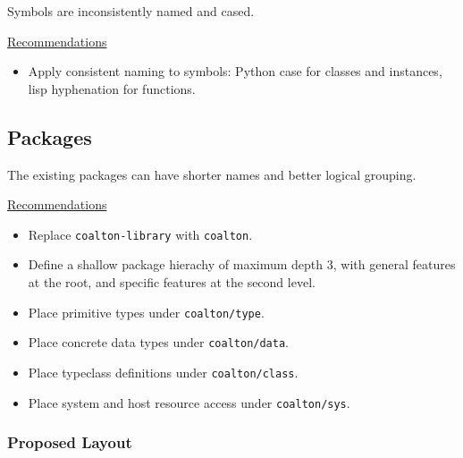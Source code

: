 \documentclass[12pt]{article}
\newcommand{\code}{\texttt}
\begin{document}
Symbols are inconsistently named and cased.

\bigskip
\underline{Recommendations}
\begin{itemize}
\item Apply consistent naming to symbols: Python case for classes and
  instances, lisp hyphenation for functions.
\end{itemize}

\subsection{Packages}

The existing packages can have shorter names and better logical grouping.

\bigskip
\underline{Recommendations}
\begin{itemize}
\item Replace \code{coalton-library} with \code{coalton}.
\item Define a shallow package hierachy of maximum depth 3, with
  general features at the root, and specific features at the second
  level.
\item Place primitive types under \code{coalton/type}.
\item Place concrete data types under \code{coalton/data}.
\item Place typeclass definitions under \code{coalton/class}.
\item Place system and host resource access under \code{coalton/sys}.
\end{itemize}

\subsubsection{Proposed Layout}

\begin{itemize}
\item coalton
\item coalton/class
\item coalton/class/iterator, monad
\item coalton/class/monad
\item coalton/data
\item coalton/data/array, hash, list, map, queue, seq, tree, tuple, vector
\item coalton/function
\item coalton/math
\item coalton/mutable
\item coalton/sys
\item coalton/sys/{file
\item coalton/type
\item coalton/type/bit, byte, char, string
\end {itemize}
\end{document}

